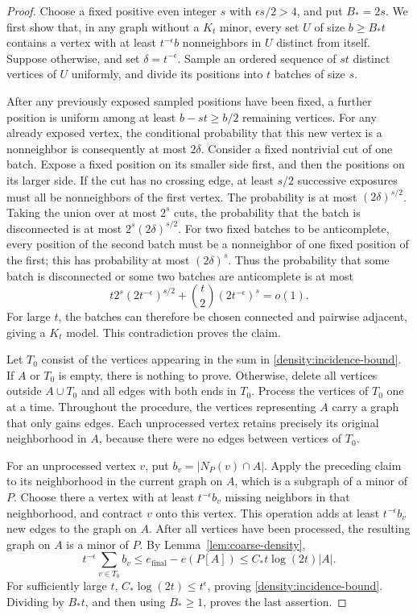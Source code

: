\begin{proof}
Choose a fixed positive even integer \(s\) with \(\epsilon s/2>4\), and
put \(B_*=2s\). We first show that, in any graph without a \(K_t\) minor,
every set \(U\) of size \(b\ge B_*t\) contains a vertex with at least
\(t^{-\epsilon}b\) nonneighbors in \(U\) distinct from itself.
Suppose otherwise, and set \(\delta=t^{-\epsilon}\).
Sample an ordered sequence of \(st\) distinct vertices of \(U\) uniformly,
and divide its positions into \(t\) batches of size \(s\).

After any previously exposed sampled positions have been fixed, a further
position is uniform among at least \(b-st\ge b/2\) remaining vertices.
For any already exposed vertex, the conditional probability that this
new vertex is a nonneighbor is consequently at most \(2\delta\).
Consider a fixed nontrivial cut of one batch. Expose a fixed position on
its smaller side first, and then the positions on its larger side.
If the cut has no crossing edge, at least \(s/2\) successive exposures
must all be nonneighbors of the first vertex. The probability is at most
\((2\delta)^{s/2}\). Taking the union over at most \(2^s\) cuts, the probability
that the batch is disconnected is at most \(2^s(2\delta)^{s/2}\).
For two fixed batches to be anticomplete, every position of the second
batch must be a nonneighbor of one fixed position of the first; this
has probability at most \((2\delta)^s\).
Thus the probability that some batch is disconnected or some two batches
are anticomplete is at most
\[
 t2^s(2t^{-\epsilon})^{s/2}
 +\binom t2(2t^{-\epsilon})^s=o(1).
\]
For large \(t\), the batches can therefore be chosen connected and pairwise
adjacent, giving a \(K_t\) model. This contradiction proves the claim.

Let \(T_0\) consist of the vertices appearing in the sum in
\eqref{density:incidence-bound}. If \(A\) or \(T_0\) is empty, there is
nothing to prove. Otherwise, delete all vertices outside \(A\cup T_0\)
and all edges with both ends in \(T_0\).
Process the vertices of \(T_0\) one at a time. Throughout the procedure,
the vertices representing \(A\) carry a graph that only gains edges.
Each unprocessed vertex retains precisely its original neighborhood in
\(A\), because there were no edges between vertices of \(T_0\).

For an unprocessed vertex \(v\), put \(b_v=|N_P(v)\cap A|\).
Apply the preceding claim to its neighborhood in the current graph on
\(A\), which is a subgraph of a minor of \(P\). Choose there a vertex
with at least \(t^{-\epsilon}b_v\) missing neighbors in that neighborhood,
and contract \(v\) onto this vertex. This operation adds at least
\(t^{-\epsilon}b_v\) new edges to the graph on \(A\).
After all vertices have been processed, the resulting graph on \(A\)
is a minor of \(P\). By Lemma~\ref{lem:coarse-density},
\[
 t^{-\epsilon}\sum_{v\in T_0}b_v
 \le e_{\mathrm{final}}-e(P[A])
 \le C_*t\log(2t)|A|.
\]
For sufficiently large \(t\), \(C_*\log(2t)\le t^\epsilon\), proving
\eqref{density:incidence-bound}. Dividing by \(B_*t\), and then using
\(B_*\ge1\), proves the last assertion.
\end{proof}


